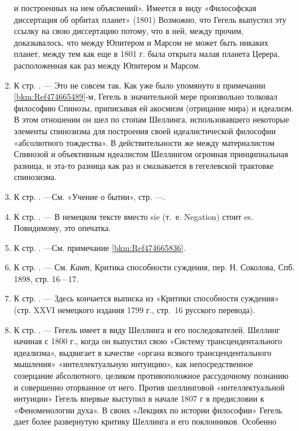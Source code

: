 \begin{enumerate}
и построенных на нем объяснений». Имеется в виду «Философская диссертация
об орбитах планет» (1801) Возможно, что Гегель выпустил эту ссылку на свою
диссертацию потому, что в ней, между прочим, доказывалось, что между
Юпитером и Марсом не может быть никаких планет, между тем как еще в 1801 г.
была открыта малая планета Церера, расположенная как раз между Юпитером и
Марсом.
\item \label{bkm:Ref474666782}К стр. \pageref{bkm:bm72}. — Это не совсем
так. Как уже было упомянуто в примечании \ref{bkm:Ref474665489}{}-м, Гегель
в значительной мере произвольно толковал философию Спинозы, приписывая ей
акосмизм (отрицание мира) и идеализм. В этом отношении он шел по стопам
Шеллинга, использовавшего некоторые элементы спинозизма для построения
своей идеалистической философии «абсолютного тождества». В действительности
же между материалистом Спинозой и объективным идеалистом Шеллингом огромная
принципиальная разница, и эта-то разница как раз и смазывается в
гегелевской трактовке спинозизма.
\item \label{bkm:Ref474666794}К стр. \pageref{bkm:bm73}. —См. «Учение о
бытии», стр. \pageref{bkm:bm73a}—\pageref{bkm:bm73b}.
\item \label{bkm:Ref474666798}К стр. \pageref{bkm:bm74}. — В немецком тексте
вместо sie (т.~е. Negation) стоит es. Повидимому, это опечатка.
\item \label{bkm:Ref474666813}К стр. \pageref{bkm:bm75}. —См. примечание
\ref{bkm:Ref474665836}.
\item \label{bkm:Ref474666829}К стр. \pageref{bkm:bm76}. — См.
{\em Кант}, Критика способности суждения, пер. Н. Соколова, Спб. 1898,
стр. 16—17.
\item \label{bkm:Ref474666833}К стр. \pageref{bkm:bm77}. — Здесь кончается
выписка из «Критики способности суждения» (стр. XXVI немецкого издания 1799
г., стр.~16 русского перевода).
\item \label{bkm:Ref474666843}К стр. \pageref{bkm:bm78}. — Гегель имеет в
виду Шеллинга и его последователей. Шеллинг начиная с 1800 г., когда он
выпустил свою «Систему трансцендентального идеализма», выдвигает в качестве
«органа всякого трансцендентального мышления» «интеллектуальную интуицию»,
как непосредственное созерцание абсолютного, целиком противоположное
рассудочному познанию и совершенно оторванное от него. Против шеллинговой
«интеллектуальной интуиции» Гегель впервые выступил в начале 1807 г в
предисловии к «Феноменологии духа». В своих «Лекциях по истории философии»
Гегель дает более развернутую критику Шеллинга и его поклонников. Особенно

\end{enumerate}
